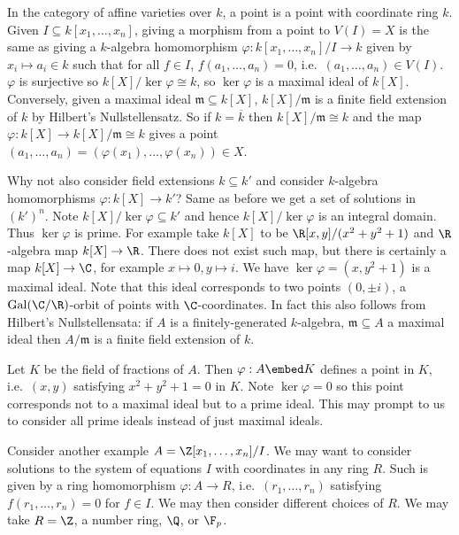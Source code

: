 \documentclass[a4paper]{article}
\begin{document}
In the category of affine varieties over \(k\), a point is a point with coordinate ring \(k\). Given \(I \subseteq k[x_1, \dots, x_n]\), giving a morphism from a point to \(V(I) = X\) is the same as giving a \(k\)-algebra homomorphism \(\varphi: k[x_1, \dots, x_n]/I \to k\) given by \(x_i \mapsto a_i \in k\) such that for all \(f \in I\), \(f(a_1, \dots, a_n) = 0\), i.e.\ \((a_1, \dots, a_n) \in V(I)\). \(\varphi\) is surjective so \(k[X]/\ker \varphi \cong k\), so \(\ker \varphi\) is a maximal ideal of \(k[X]\). Conversely, given a maximal ideal \(\mathfrak m \subseteq k[X]\), \(k[X]/\mathfrak m\) is a finite field extension of \(k\) by Hilbert's Nullstellensatz. So if \(k = \overline k\) then \(k[X]/\mathfrak m \cong k\) and the map \(\varphi: k[X] \to k[X]/\mathfrak m \cong k\) gives a point \((a_1, \dots, a_n) = (\varphi(x_1), \dots, \varphi(x_n)) \in X\).

Why not also consider field extensions \(k \subseteq k'\) and consider \(k\)-algebra homomorphisms \(\varphi: k[X] \to k'\)? Same as before we get a set of solutions in \((k')^n\). Note \(k[X]/\ker \varphi \subseteq k'\) and hence \(k[X]/\ker \varphi\) is an integral domain. Thus \(\ker \varphi\) is prime. For example take \(k[X]\) to be \(\R[x, y]/(x^2 + y^2 + 1)\) and \(\R\)-algebra map \(k[X] \to \R\). There does not exist such map, but there is certainly a map \(k[X] \to \C\), for example \(x \mapsto 0, y \mapsto i\). We have \(\ker \varphi = (x, y^2 + 1)\) is a maximal ideal. Note that this ideal corresponds to two points \((0, \pm i)\), a \(\operatorname{Gal}(\C/\R)\)-orbit of points with \(\C\)-coordinates. In fact this also follows from Hilbert's Nullstellensata: if \(A\) is a finitely-generated \(k\)-algebra, \(\mathfrak m \subseteq A\) a maximal ideal then \(A/\mathfrak m\) is a finite field extension of \(k\).

Let \(K\) be the field of fractions of \(A\). Then \(\varphi: A \embed K\) defines a point in \(K\), i.e.\ \((x, y)\) satisfying \(x^2 + y^2 + 1 = 0\) in \(K\). Note \(\ker \varphi = 0\) so this point corresponds not to a maximal ideal but to a prime ideal. This may prompt to us to consider all prime ideals instead of just maximal ideals.

Consider another example \(A = \Z[x_1, \dots, x_n]/I\). We may want to consider solutions to the system of equations \(I\) with coordinates in any ring \(R\). Such is given by a ring homomorphism \(\varphi: A \to R\), i.e.\ \((r_1, \dots, r_n)\) satisfying \(f(r_1, \dots, r_n) = 0\) for \(f \in I\). We may then consider different choices of \(R\). We may take \(R = \Z\), a number ring, \(\Q\), or \(\F_p\).
\end{document}
